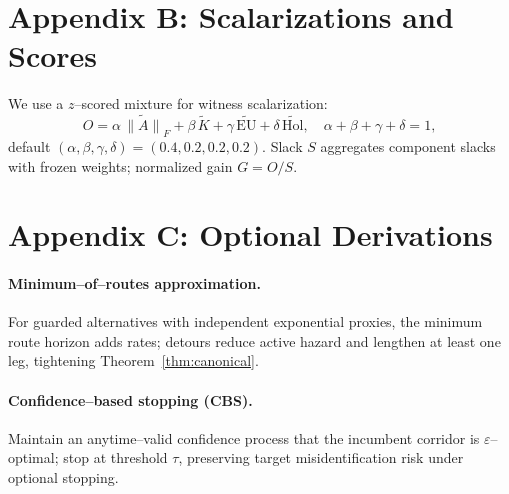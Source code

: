 \documentclass[11pt]{article}
\begin{document}
\section*{Appendix B: Scalarizations and Scores}
We use a $z$--scored mixture for witness scalarization:
\[
O=\alpha\,\widetilde{\|A\|}_F+\beta\,\widetilde{K}+\gamma\,\widetilde{\text{EU}}+\delta\,\widetilde{\text{Hol}},
\quad \alpha+\beta+\gamma+\delta=1,
\]
default $(\alpha,\beta,\gamma,\delta)=(0.4,0.2,0.2,0.2)$. Slack $S$ aggregates component slacks with frozen weights; normalized gain $G=O/S$.

\section*{Appendix C: Optional Derivations}
\paragraph{Minimum--of--routes approximation.} For guarded alternatives with independent exponential proxies, the minimum route horizon adds rates; detours reduce active hazard and lengthen at least one leg, tightening Theorem~\ref{thm:canonical}.

\paragraph{Confidence--based stopping (CBS).} Maintain an anytime--valid confidence process that the incumbent corridor is $\varepsilon$--optimal; stop at threshold $\tau$, preserving target misidentification risk under optional stopping.
\end{document}
